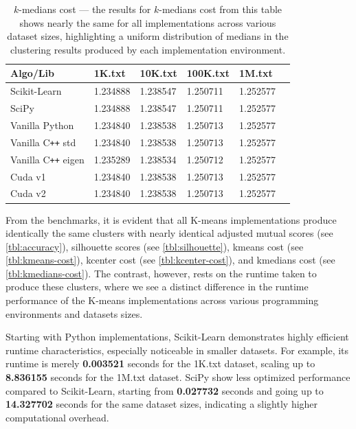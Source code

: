 \documentclass{article}
\begin{document}
  \begin{table}[H]
    \centering
    \begin{tabular}{|P{4cm}|P{2.5cm}|P{2.5cm}|P{2.5cm}|P{2.5cm}|P{2.5cm}|}
      \hline
      {\sf Algo/Lib} & {\sf 1K.txt} & {\sf 10K.txt} & {\sf 100K.txt} & {\sf 1M.txt} \\ \hline
      {\sc Scikit-Learn} & 1.234888 & 1.238547 & 1.250711 & 1.252577 \\
      {\sc SciPy} & 1.234888 & 1.238547 & 1.250711 & 1.252577 \\
      {\sc Vanilla Python} & 1.234840 & 1.238538 & 1.250713 & 1.252577 \\
      {\sc Vanilla C{\tt++} std} & 1.234840 & 1.238538 & 1.250713 & 1.252577 \\
      {\sc Vanilla C{\tt++} eigen} & 1.235289 & 1.238534 & 1.250712 & 1.252577 \\
      {\sc Cuda v1} & 1.234840 & 1.238538 & 1.250713 & 1.252577 \\
      {\sc Cuda v2} & 1.234840 & 1.238538 & 1.250713 & 1.252577 \\ \hline
    \end{tabular}
    \caption{
      $k$-medians cost --- the results for $k$-medians cost from this table
      shows nearly the same for all implementations across various dataset
      sizes, highlighting a uniform distribution of medians in the clustering
      results produced by each implementation environment.
    }
    \label{tbl:kmedians-cost}
  \end{table}

  From the benchmarks, it is evident that all {\sc K-means} implementations produce
  identically the same clusters with nearly identical adjusted mutual scores (see
  \autoref{tbl:accuracy}), silhouette scores (see \autoref{tbl:silhouette}), kmeans
  cost (see \autoref{tbl:kmeans-cost}), kcenter cost (see \autoref{tbl:kcenter-cost}),
  and kmedians cost (see \autoref{tbl:kmedians-cost}). The contrast, however, rests
  on the runtime taken to produce these clusters, where we see a distinct difference
  in the runtime performance of the {\sc K-means} implementations across  various
  programming environments and datasets sizes. \medskip

  Starting with {\sc Python} implementations, {\sc Scikit-Learn} demonstrates highly
  efficient runtime characteristics, especially noticeable in smaller datasets.
  For example, its runtime is merely {\bf 0.003521} seconds for the {\sf 1K.txt} dataset,
  scaling up to {\bf 8.836155} seconds for the {\sf 1M.txt} dataset. {\sc SciPy}
  show less optimized performance compared to {\sc Scikit-Learn}, starting from
  {\bf 0.027732} seconds and going up to {\bf 14.327702} seconds for the same dataset
  sizes, indicating a slightly higher computational overhead. \medskip
\end{document}
